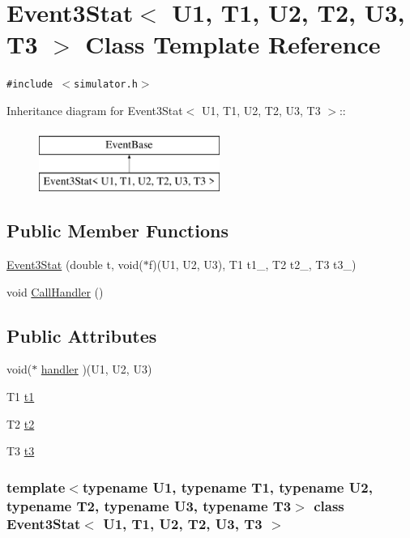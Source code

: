 \hypertarget{classEvent3Stat}{
\section{Event3Stat$<$ U1, T1, U2, T2, U3, T3 $>$ Class Template Reference}
\label{classEvent3Stat}
}
{\tt \#include $<$simulator.h$>$}

Inheritance diagram for Event3Stat$<$ U1, T1, U2, T2, U3, T3 $>$::\begin{figure}[H]
\begin{center}
\leavevmode
\includegraphics[height=2cm]{classEvent3Stat}
\end{center}
\end{figure}
\subsection*{Public Member Functions}
\begin{CompactItemize}
\item 
\hyperlink{classEvent3Stat_2bebf5183e80cc269d6282ea0569f8e0}{Event3Stat} (double t, void($\ast$f)(U1, U2, U3), T1 t1\_, T2 t2\_, T3 t3\_)
\item 
void \hyperlink{classEvent3Stat_6901cb7acfdb3f021edd0a79c1766349}{CallHandler} ()
\end{CompactItemize}
\subsection*{Public Attributes}
\begin{CompactItemize}
\item 
void($\ast$ \hyperlink{classEvent3Stat_9a4bc9da2d5b2fac78aa4b01fc842218}{handler} )(U1, U2, U3)
\item 
T1 \hyperlink{classEvent3Stat_9fec91fe7e92c4eba9a09defa58d5431}{t1}
\item 
T2 \hyperlink{classEvent3Stat_33217dc4cdc50f79c062e8e42cd7f5d2}{t2}
\item 
T3 \hyperlink{classEvent3Stat_046cd41d71f5aa91fbf6e509602ebe13}{t3}
\end{CompactItemize}
\subsubsection*{template$<$typename U1, typename T1, typename U2, typename T2, typename U3, typename T3$>$ class Event3Stat$<$ U1, T1, U2, T2, U3, T3 $>$}



